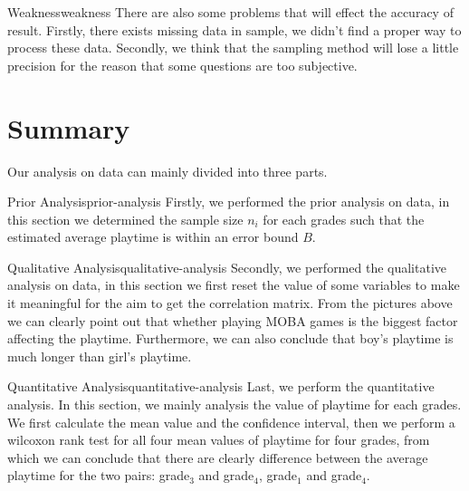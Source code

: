 \documentclass[scheme=plain]{ctexart}
\begin{document}
\begin{analysis}{Weakness}{weakness}
There are also some problems that will effect the accuracy of result. Firstly, there exists missing data in sample, we didn't find a proper way to process these data. Secondly, we think that
the sampling method will lose a little precision for the reason that some questions are too subjective.
\end{analysis}



\section{Summary}
Our analysis on data can mainly divided into three parts.

\begin{analysis}{Prior Analysis}{prior-analysis}
Firstly, we performed the prior analysis on data, in this section we determined the sample size $n_i$ for each grades such that the estimated average playtime is within an error bound $B$.
\end{analysis}

\begin{analysis}{Qualitative Analysis}{qualitative-analysis}
Secondly, we performed the qualitative analysis on data, in this section we first reset the value of some variables to make it meaningful for the aim to get the correlation matrix. From the pictures above we can clearly point out that whether playing MOBA games is the biggest factor affecting the playtime. Furthermore, we can also conclude that boy's playtime is much longer than girl's playtime.
\end{analysis}

\begin{analysis}{Quantitative Analysis}{quantitative-analysis}
Last, we perform the quantitative analysis. In this section, we mainly analysis the value of playtime for each grades. We first calculate the mean value and the confidence interval, then we perform a wilcoxon rank test for all four mean values of playtime for four grades, from which we can conclude that there are clearly difference between the average playtime  for the two pairs: grade$_3$ and grade$_4$, grade$_1$ and grade$_4$.
\end{analysis}
\end{document}
